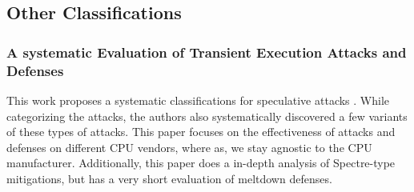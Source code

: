 \subsection{Other Classifications}

\subsubsection{A systematic Evaluation of Transient Execution Attacks and Defenses}

This work proposes a systematic classifications for speculative attacks \cite{b48}. While categorizing
the attacks, the authors also systematically discovered a few variants of these types of attacks.
This paper focuses on the effectiveness of attacks and defenses on different CPU vendors, where as,
we stay agnostic to the CPU manufacturer. Additionally, this paper does a in-depth analysis of Spectre-type
mitigations, but has a very short evaluation of meltdown defenses.
